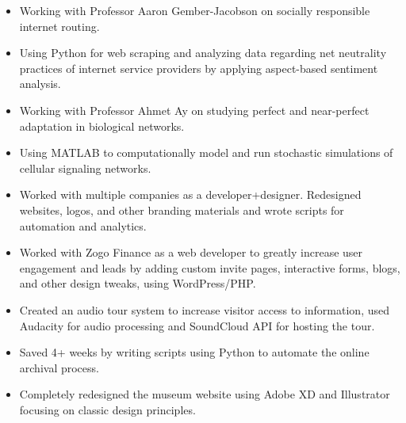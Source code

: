 \documentclass[a4paper]{resume}
\begin{document}
\begin{itemize} \vspace{-5pt} \itemsep -2pt
	\item Working with Professor Aaron Gember-Jacobson on socially responsible internet routing.
	\item Using Python for web scraping and analyzing data regarding net neutrality practices of internet service providers by applying aspect-based sentiment analysis.	
\end{itemize}
\enresubsection
{}
\begin{itemize} \vspace{-5pt} \itemsep -2pt
	\item Working with Professor Ahmet Ay on studying perfect and near-perfect adaptation in biological networks. 
	\item Using MATLAB to computationally model and run stochastic simulations of cellular signaling networks. 
\end{itemize}
\enresubsection
{}
\begin{itemize} \vspace{-5pt} \itemsep -2pt
	\item Worked with multiple companies as a developer+designer. Redesigned websites, logos, and other branding materials and wrote scripts for automation and analytics.
	\item Worked with Zogo Finance as a web developer to greatly increase user engagement and leads by adding custom invite pages, interactive forms, blogs, and other design tweaks, using WordPress/PHP.
\end{itemize}
\enresubsection
{}
\begin{itemize} \vspace{-5pt} \itemsep -2pt
	\item Created an audio tour system to increase visitor access to information, used Audacity for audio processing and SoundCloud API for hosting the tour.
	\item Saved 4+ weeks by writing scripts using Python to automate the online archival process.
	\item Completely redesigned the museum website using Adobe XD and Illustrator focusing on classic design principles.
\end{itemize}
\end{document}
